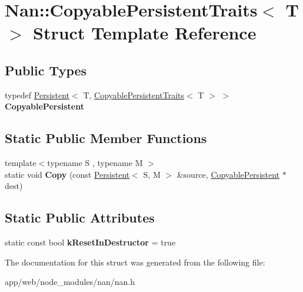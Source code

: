 \hypertarget{struct_nan_1_1_copyable_persistent_traits}{}\section{Nan\+:\+:Copyable\+Persistent\+Traits$<$ T $>$ Struct Template Reference}
\label{struct_nan_1_1_copyable_persistent_traits}
\subsection*{Public Types}
\begin{DoxyCompactItemize}
\item 
\mbox{\label{struct_nan_1_1_copyable_persistent_traits_a0963a92d17f75ab6fcb28d7e1d2945ce}} 
typedef \hyperlink{class_nan_1_1_persistent}{Persistent}$<$ T, \hyperlink{struct_nan_1_1_copyable_persistent_traits}{Copyable\+Persistent\+Traits}$<$ T $>$ $>$ {\bfseries Copyable\+Persistent}
\end{DoxyCompactItemize}
\subsection*{Static Public Member Functions}
\begin{DoxyCompactItemize}
\item 
\mbox{\label{struct_nan_1_1_copyable_persistent_traits_aa8ab1efa6c942c5cfe39ccdb2c0ae09b}} 
{\footnotesize template$<$typename S , typename M $>$ }\\static void {\bfseries Copy} (const \hyperlink{class_nan_1_1_persistent}{Persistent}$<$ S, M $>$ \&source, \hyperlink{class_nan_1_1_persistent}{Copyable\+Persistent} $\ast$dest)
\end{DoxyCompactItemize}
\subsection*{Static Public Attributes}
\begin{DoxyCompactItemize}
\item 
\mbox{\label{struct_nan_1_1_copyable_persistent_traits_aa2f9504750dd2209e3a5fe0e7944f64b}} 
static const bool {\bfseries k\+Reset\+In\+Destructor} = true
\end{DoxyCompactItemize}


The documentation for this struct was generated from the following file\+:\begin{DoxyCompactItemize}
\item 
app/web/node\+\_\+modules/nan/nan.\+h\end{DoxyCompactItemize}
